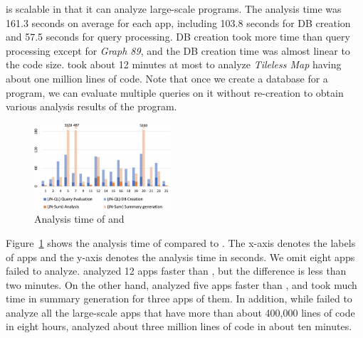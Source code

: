 \ours is scalable in that it can analyze large-scale programs. 
The analysis time was 161.3 seconds on average for each app, including 103.8
seconds for DB creation and 57.5 seconds for query processing.  
DB creation took more time than query processing except for {\it Graph 89}, and
the DB creation time was almost linear to the code size. 
\ours took about 12 minutes at most to analyze {\it Tileless Map} having about
one million lines of code.
Note that once we create a database for a program, we can evaluate multiple
queries on it without re-creation to obtain various analysis results of the
program.

\begin{figure}[t]
  \centering
  \vspace{2mm}
  \includegraphics[width=0.45\textwidth]{img/graph}
  \vspace*{-.5em}
  \caption{Analysis time of \ours and \lees}
  \label{fig:graph}
\vspace*{-1em}
\end{figure}

Figure~\ref{fig:graph} shows the analysis time of \ours compared to \lees.
The x-axis denotes the labels of apps and the y-axis denotes the analysis time
in seconds. We omit eight apps \lees failed to analyze.
\lees analyzed 12 apps faster than \ours, but the difference is less than two
minutes. 
On the other hand, \ours analyzed five apps faster than \lees, and \lees took
much time in summary generation for three apps of them. 
In addition, while \lees failed to analyze all the large-scale apps that have
more than about 400,000 lines of code in eight hours, \ours analyzed about
three million lines of code in about ten minutes.

